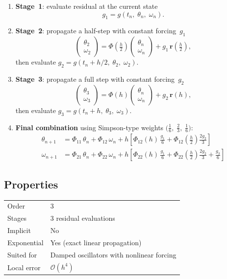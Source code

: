 \documentclass[11pt,a4paper]{article}
\newcommand{\br}{\mathbf{r}}
\newcommand{\bigO}{\mathcal{O}}
\begin{document}
\begin{enumerate}
  \item \textbf{Stage~1}: evaluate residual at the current state
  \[
    g_1 = g(t_n,\;\theta_n,\;\omega_n).
  \]

  \item \textbf{Stage~2}: propagate a half-step with constant forcing~$g_1$
  \[
    \begin{pmatrix}\theta_2 \\ \omega_2\end{pmatrix}
    = \Phi\!\left(\tfrac{h}{2}\right)
      \begin{pmatrix}\theta_n \\ \omega_n\end{pmatrix}
    + g_1\,\br\!\left(\tfrac{h}{2}\right),
  \]
  then evaluate $g_2 = g(t_n + h/2,\;\theta_2,\;\omega_2)$.

  \item \textbf{Stage~3}: propagate a full step with constant forcing~$g_2$
  \[
    \begin{pmatrix}\theta_3 \\ \omega_3\end{pmatrix}
    = \Phi(h)\begin{pmatrix}\theta_n \\ \omega_n\end{pmatrix}
    + g_2\,\br(h),
  \]
  then evaluate $g_3 = g(t_n + h,\;\theta_3,\;\omega_3)$.

  \item \textbf{Final combination} using Simpson-type weights
        $\bigl(\tfrac{1}{6},\;\tfrac{2}{3},\;\tfrac{1}{6}\bigr)$:
  \begin{align}
    \theta_{n+1} &= \Phi_{11}\,\theta_n + \Phi_{12}\,\omega_n
      + h\left[\Phi_{12}(h)\,\frac{g_1}{6}
        + \Phi_{12}\!\left(\tfrac{h}{2}\right)\frac{2g_2}{3}\right]
      \label{eq:den3-theta}\\[4pt]
    \omega_{n+1} &= \Phi_{21}\,\theta_n + \Phi_{22}\,\omega_n
      + h\left[\Phi_{22}(h)\,\frac{g_1}{6}
        + \Phi_{22}\!\left(\tfrac{h}{2}\right)\frac{2g_2}{3}
        + \frac{g_3}{6}\right]
      \label{eq:den3-omega}
  \end{align}
\end{enumerate}

\subsection{Properties}
\begin{center}
\begin{tabular}{ll}
  \hline
  Order             & 3 \\
  Stages            & 3 residual evaluations \\
  Implicit          & No \\
  Exponential       & Yes (exact linear propagation) \\
  Suited for        & Damped oscillators with nonlinear forcing \\
  Local error       & $\bigO(h^4)$ \\
  \hline
\end{tabular}
\end{center}
\end{document}
